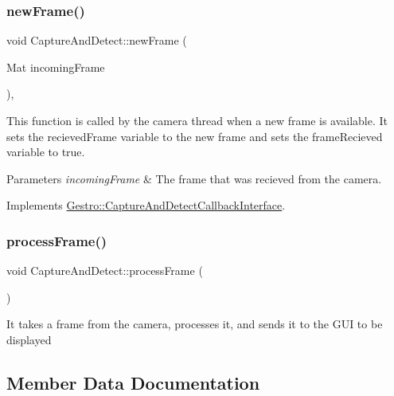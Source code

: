 \subsubsection{\texorpdfstring{new\+Frame()}{newFrame()}}
{\footnotesize\ttfamily void Capture\+And\+Detect\+::new\+Frame (\begin{DoxyParamCaption}\item[{Mat}]{incoming\+Frame }\end{DoxyParamCaption})\hspace{0.3cm}{\ttfamily [override]}, {\ttfamily [virtual]}}

This function is called by the camera thread when a new frame is available. It sets the recieved\+Frame variable to the new frame and sets the frame\+Recieved variable to true.


\begin{DoxyParams}{Parameters}
{\em incoming\+Frame} & The frame that was recieved from the camera. \\
\hline
\end{DoxyParams}


Implements \hyperlink{classGestro_1_1CaptureAndDetectCallbackInterface_a9a42d0f1b3fd64cea607eeb4e6a46287}{Gestro\+::\+Capture\+And\+Detect\+Callback\+Interface}.

\mbox{\label{classGestro_1_1CaptureAndDetect_ac7e70bbcade4e0023541c556ee7cb34e}} 
\subsubsection{\texorpdfstring{process\+Frame()}{processFrame()}}
{\footnotesize\ttfamily void Capture\+And\+Detect\+::process\+Frame (\begin{DoxyParamCaption}{ }\end{DoxyParamCaption})}

It takes a frame from the camera, processes it, and sends it to the G\+UI to be displayed 

\subsection{Member Data Documentation}
\mbox{\label{classGestro_1_1CaptureAndDetect_acbe1ce90cb6a7bad1c94a6be68cc4f0b}} 
